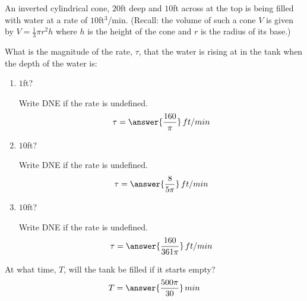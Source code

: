 \documentclass{ximera}
\author{Gregory Hartman \and Matthew Carr}
\begin{document}
\begin{exercise}




An inverted cylindrical cone, $20$ft deep and $10$ft across at the top
is being filled with water at a rate of $10$ft$^3$/min. (Recall: the
volume of such a cone $V$ is given by $V=\frac{1}{3}\pi r^2 h$ where
$h$ is the height of the cone and $r$ is the radius of its base.)

What is the magnitude of the rate, $\tau$, that the water is rising at
in the tank when the depth of the water is:
\begin{enumerate}
\item $1$ft? \begin{prompt}Write DNE if the rate is undefined. \[\tau=\answer{\frac{160}{\pi}}\,ft/min\]\end{prompt}
\item $10$ft? \begin{prompt}Write DNE if the rate is undefined. \[\tau=\answer{\frac{8}{5\pi}}\,ft/min\]\end{prompt}
\item $10$ft? \begin{prompt}Write DNE if the rate is undefined. \[\tau=\answer{\frac{160}{361\pi}}\,ft/min\]\end{prompt}
\end{enumerate}
\begin{prompt}
At what time, $T$, will the tank be filled if it starts empty?
\[
T=\answer{\frac{500\pi}{30}}\,min
\]
\end{prompt}
\end{exercise}
\end{document}
